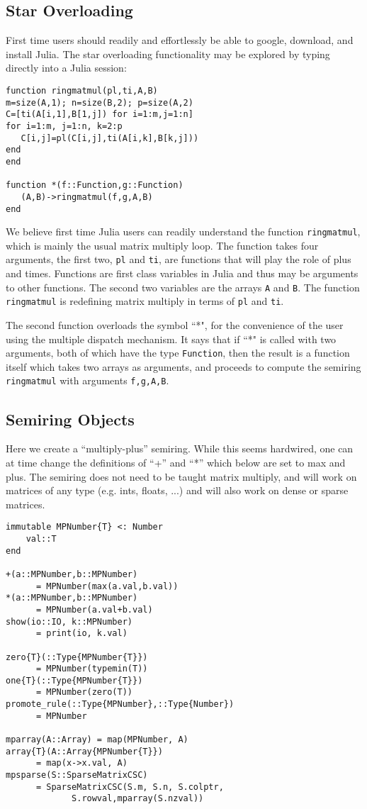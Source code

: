 \documentclass[conference]{IEEEtran}
\begin{document}
\subsection{Star Overloading}

First time users should readily and effortlessly be able to google, download, and install Julia.
The star overloading functionality may be explored by typing directly into a Julia session:
\begin{verbatim}
function ringmatmul(pl,ti,A,B)
m=size(A,1); n=size(B,2); p=size(A,2)
C=[ti(A[i,1],B[1,j]) for i=1:m,j=1:n]
for i=1:m, j=1:n, k=2:p
   C[i,j]=pl(C[i,j],ti(A[i,k],B[k,j]))
end    
end      
   
function *(f::Function,g::Function)
   (A,B)->ringmatmul(f,g,A,B)
end
\end{verbatim}

We believe first time Julia users can readily understand the function {\tt ringmatmul}, which is mainly the usual matrix multiply loop.
The function takes four arguments, the first two, {\tt pl} and {\tt ti}, are functions that will play the role of plus and times.  Functions are first class variables in Julia and thus may be arguments to other functions.  The second two variables are the arrays {\tt A} and {\tt B}.
The function {\tt ringmatmul} is redefining matrix multiply in terms of {\tt pl} and {\tt ti}.

The second function overloads the symbol ``*", for the convenience of the user using the multiple dispatch mechanism.  It says that if ``*"  is called with two arguments, both of which have the type {\tt Function}, then the result is a function itself which takes two arrays as arguments, and proceeds to compute the semiring  {\tt ringmatmul} with arguments {\tt f,g,A,B}.


\subsection{Semiring Objects}

Here we create a ``multiply-plus'' semiring.  While this seems hardwired, one
can at time change the definitions of  ``+'' and ``*'' which below are set to 
max and plus.  The semiring does not need to be taught matrix multiply,
and will work on matrices of any type (e.g. ints, floats, ...) and will
also work on dense or sparse matrices.



\begin{verbatim}
immutable MPNumber{T} <: Number
    val::T
end

+(a::MPNumber,b::MPNumber)
      = MPNumber(max(a.val,b.val))
*(a::MPNumber,b::MPNumber)
      = MPNumber(a.val+b.val)
show(io::IO, k::MPNumber)
      = print(io, k.val)

zero{T}(::Type{MPNumber{T}})
      = MPNumber(typemin(T))
one{T}(::Type{MPNumber{T}})
      = MPNumber(zero(T))
promote_rule(::Type{MPNumber},::Type{Number}) 
      = MPNumber

mparray(A::Array) = map(MPNumber, A)
array{T}(A::Array{MPNumber{T}})
      = map(x->x.val, A)
mpsparse(S::SparseMatrixCSC)
      = SparseMatrixCSC(S.m, S.n, S.colptr, 
             S.rowval,mparray(S.nzval))
\end{verbatim}
\end{document}
